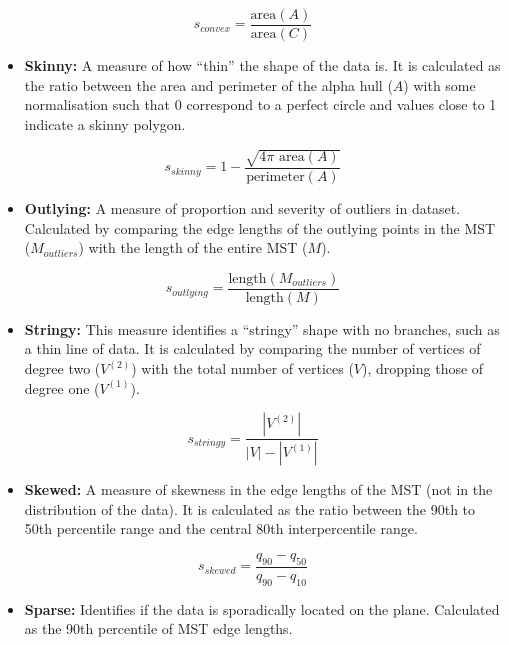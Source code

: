 \[s_{convex}=\frac{\mbox{area}(A)}{\mbox{area}(C)}\]

\begin{itemize}
\tightlist
\item
  \textbf{Skinny:} A measure of how ``thin'' the shape of the data is. It is calculated as the ratio between the area and perimeter of the alpha hull (\(A\)) with some normalisation such that 0 correspond to a perfect circle and values close to 1 indicate a skinny polygon.
\end{itemize}

\[s_{skinny}= 1-\frac{\sqrt{4\pi \mbox{ area}(A)}}{\mbox{perimeter}(A)}\]

\begin{itemize}
\tightlist
\item
  \textbf{Outlying:} A measure of proportion and severity of outliers in dataset. Calculated by comparing the edge lengths of the outlying points in the MST (\(M_{outliers}\)) with the length of the entire MST (\(M\)).
\end{itemize}

\[s_{outlying}=\frac{\mbox{length}(M_{outliers})}{\mbox{length}(M)}\]

\begin{itemize}
\tightlist
\item
  \textbf{Stringy:} This measure identifies a ``stringy'' shape with no branches, such as a thin line of data. It is calculated by comparing the number of vertices of degree two (\(V^{(2)}\)) with the total number of vertices (\(V\)), dropping those of degree one (\(V^{(1)}\)).
\end{itemize}

\[s_{stringy} = \frac{|V^{(2)}|}{|V|-|V^{(1)}|}\]

\begin{itemize}
\tightlist
\item
  \textbf{Skewed:} A measure of skewness in the edge lengths of the MST (not in the distribution of the data). It is calculated as the ratio between the 90th to 50th percentile range and the central 80th interpercentile range.
\end{itemize}

\[s_{skewed} = \frac{q_{90}-{q_{50}}}{q_{90}-q_{10}}\]

\begin{itemize}
\tightlist
\item
  \textbf{Sparse:} Identifies if the data is sporadically located on the plane. Calculated as the 90th percentile of MST edge lengths.
\end{itemize}

